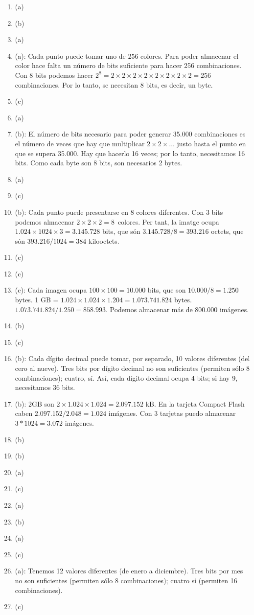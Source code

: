 \begin{enumerate}
\item (a) \item (b) \item (a) \item (a): Cada punto puede tomar uno de 256 colores. Para poder almacenar el color hace falta un número de bits suficiente para hacer 256 combinaciones. Con 8 bits podemos hacer \(2^8=2\times2\times 2\times 2\times 2\times 2\times 2\times 2=256\) combinaciones. Por lo tanto, se necesitan 8 bits, es decir, un byte. \item (c) 

\item (a) \item (b): El número de bits necesario para poder generar 35.000 combinaciones es el número de veces que hay que multiplicar \(2\times 2\times\ldots\) justo hasta el punto en que se supera 35.000. Hay que hacerlo 16 veces; por lo tanto, necesitamos 16 bits. Como cada byte son 8 bits, son necesarios 2 bytes. \item (a) \item (c) \item (b): Cada punto puede presentarse en 8 colores diferentes. Con 3 bits podemos almacenar \(2\times2\times2=8\)~colores. Per tant, la imatge ocupa $1.024 \times 1024 \times 3 = 3.145.728$ bits, que són $3.145.728/8=393.216$ octets, que són $393.216/1024=384$ kilooctets. 

\item (c) \item (c) \item (c): Cada imagen ocupa $100\times100 = 10.000$ bits, que son $10.000 / 8 = 1.250$ bytes. 1 GB = $1.024 \times 1.024 \times 1.204 = 1.073.741.824 $ bytes.\\ $ 1.073.741.824 / 1.250 = 858.993$. Podemos almacenar más de 800.000 imágenes. \item (b) \item (c) 

\item (b): Cada dígito decimal puede tomar, por separado, 10 valores diferentes (del cero al nueve). Tres bits por dígito decimal no son suficientes (permiten sólo 8 combinaciones); cuatro, sí. Así, cada dígito decimal ocupa 4 bits; si hay 9, necesitamos 36 bits. \item (b): 2GB son $ 2\times 1.024 \times 1.024 = 2.097.152$ kB. En la tarjeta Compact Flash caben $ 2.097.152 / 2.048 = 1.024$ imágenes. Con 3 tarjetas puedo almacenar $ 3 * 1024 = 3.072$ imágenes. \item (b) \item (b) \item (a) 

\item (c) \item (a) \item (b) \item (a) \item (c) 

\item (a): Tenemos 12 valores diferentes (de enero a diciembre). Tres bits por mes no son suficientes (permiten sólo 8 combinaciones); cuatro sí (permiten 16 combinaciones). \item (c) \end{enumerate} 
